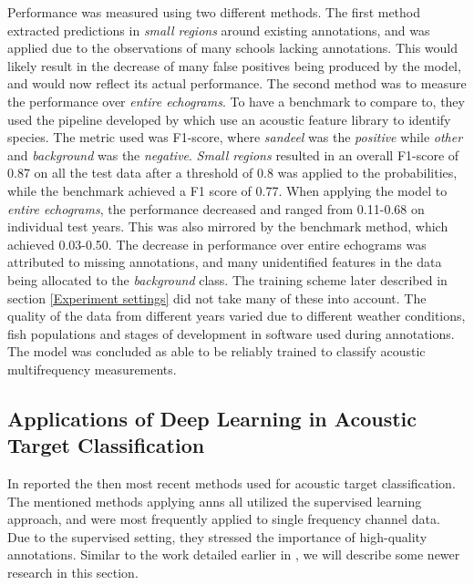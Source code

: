     Performance was measured using two different methods\cite{brautaset2020acoustic}. The first method extracted predictions in \textit{small regions} around existing annotations, and was applied due to  the observations of many schools lacking annotations. This would likely result in the decrease of many false positives being produced by the model, and would now reflect its actual performance. The second method was to measure the performance over \textit{entire echograms}. To have a benchmark to compare to, they used the pipeline developed by \citet{korneliussen2016acoustic} which use an acoustic feature library to identify species. The metric used was F1-score, where \textit{sandeel} was the \textit{positive}   while \textit{other} and \textit{background} was the \textit{negative}. \textit{Small regions} resulted in an overall F1-score of 0.87 on all the test data after a threshold of 0.8 was applied to the probabilities, while the benchmark achieved a F1 score of 0.77. When applying the model to \textit{entire echograms}, the performance decreased and ranged from 0.11-0.68 on individual test years. This was also mirrored by the benchmark method, which achieved 0.03-0.50. The decrease in performance over entire echograms was attributed to missing annotations, and many unidentified features in the data being allocated to the \textit{background} class. The training scheme later described in section \ref{Experiment settings} did not take many of these into account. The quality of the data from different years varied due to different weather conditions, fish populations and stages of development in software used during annotations. The model was concluded as able to be reliably trained to classify acoustic multifrequency measurements\cite{brautaset2020acoustic}.
    
\subsection{Applications of Deep Learning in Acoustic Target Classification}
In \citeyear{korneliussen2018acoustic} \citet{korneliussen2018acoustic} reported the then most recent methods used for acoustic target classification. The mentioned methods applying \gls{ann}s all utilized the supervised learning approach, and were most frequently applied to single frequency channel data. Due to the supervised setting, they stressed the importance of high-quality annotations. Similar to the work detailed earlier in \citet{brautaset2020acoustic}, we will describe some newer research in this section.
   
